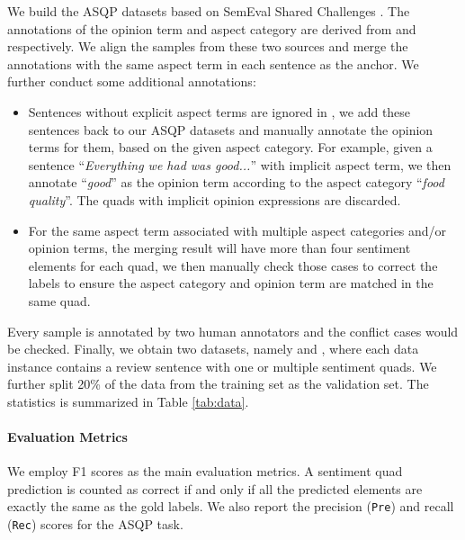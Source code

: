 \documentclass[11pt]{article}
\begin{document}
We build the ASQP datasets based on SemEval Shared Challenges \cite{semeval15-absa, semeval16-absa}. The annotations of the opinion term and aspect category are derived from \citet{aaai20-robin} and \citet{aaai20-tasd} respectively. We align the samples from these two sources and merge the annotations with the same aspect term in each sentence as the anchor. We further conduct some additional annotations:
\begin{itemize}[leftmargin=*]
    \setlength{\itemsep}{0pt}
    \setlength{\parsep}{0pt}
    \setlength{\parskip}{0pt}
    \item Sentences without explicit aspect terms are ignored in \citet{aaai20-robin}, we add these sentences back to our ASQP datasets and manually annotate the opinion terms for them, based on the given aspect category. For example, given a sentence ``\textit{Everything we had was good...}'' with implicit aspect term, we then annotate ``\textit{good}'' as the opinion term according to the aspect category ``\textit{food quality}''. The quads with implicit opinion expressions are discarded.
    
    \item For the same aspect term associated with multiple aspect categories and/or opinion terms, the merging result will have more than four sentiment elements for each quad, we then manually check those cases to correct the labels to ensure the aspect category and opinion term are matched in the same quad.   
    
\end{itemize}


Every sample is annotated by two human annotators and the conflict cases would be checked. Finally, we obtain two datasets, namely  and , where each data instance contains a review sentence with one or multiple sentiment quads. We further split 20\% of the data from the training set as the validation set. The statistics is summarized in Table \ref{tab:data}.


\paragraph{Evaluation Metrics} We employ F1 scores as the main evaluation metrics. A sentiment quad prediction is counted as correct if and only if all the predicted elements are exactly the same as the gold labels. We also report the precision (\verb|Pre|) and recall (\verb|Rec|) scores for the ASQP task.  
\end{document}
